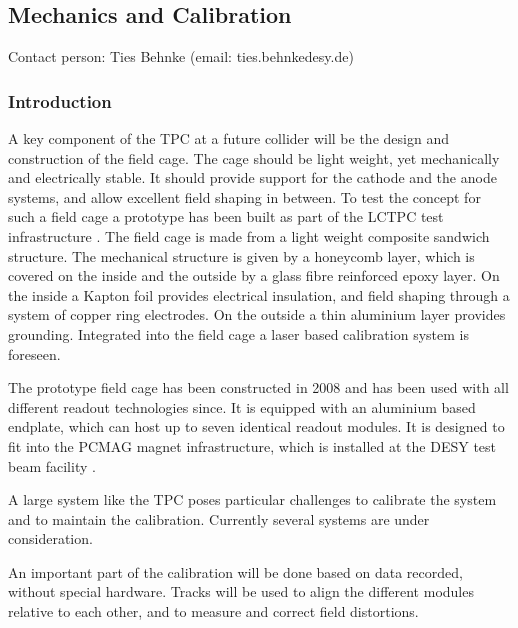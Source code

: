 \subsection{Mechanics and Calibration}\label{chap:TPC_sec:mechanics}
Contact person: Ties Behnke (email: ties.behnke\@ desy.de)\\

\subsubsection{Introduction}
A key component of the TPC at a future collider will be the design and construction of the field cage. The cage should be light weight, yet mechanically and electrically stable. It should provide support for the cathode and the anode systems, and allow excellent field shaping in between.
To test the concept for such a field cage a prototype has been built as part of the LCTPC test infrastructure \cite{Schade}. The field cage is made from a light weight composite sandwich structure. The mechanical structure is given by a honeycomb layer, which is covered on the inside and the outside by a glass fibre reinforced epoxy layer. On the inside a Kapton foil provides electrical insulation, and field shaping through a system of copper ring electrodes. On the outside a thin aluminium layer provides grounding. Integrated into the field cage a laser based calibration system is foreseen.

The prototype field cage has been constructed in 2008 and has been used with all different readout technologies since. It is equipped with an aluminium based endplate, which can host up to seven identical readout modules. It is designed to fit into the PCMAG magnet \cite{pcmag:magnet} infrastructure, which is installed at the DESY test beam facility \cite{DESY2TB}.


A large system like the TPC poses particular challenges to calibrate the system and to maintain the calibration. Currently several systems are under consideration.

An important part of the calibration will be done based on data recorded, without special hardware. Tracks will be used to align the different modules relative to each other, and to measure and correct field distortions.

